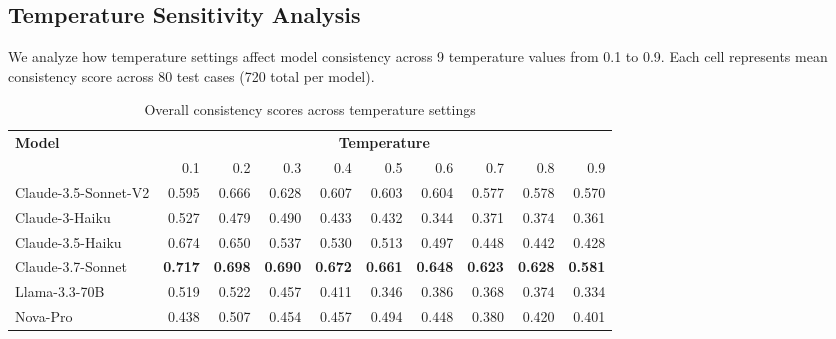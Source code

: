 \documentclass{article}
\begin{document}
\subsection{Temperature Sensitivity Analysis}

We analyze how temperature settings affect model consistency across 9 temperature values from 0.1 to 0.9. Each cell represents mean consistency score across 80 test cases (720 total per model).

\begin{table}[H]
\centering
\caption{Overall consistency scores across temperature settings}
\label{tab:overall-consistency-temp}
\begin{tabular}{lrrrrrrrrr}
\toprule
\textbf{Model} & \multicolumn{9}{c}{\textbf{Temperature}} \\
\cmidrule{2-10}
 & 0.1 & 0.2 & 0.3 & 0.4 & 0.5 & 0.6 & 0.7 & 0.8 & 0.9 \\
\midrule
Claude-3.5-Sonnet-V2 & 0.595 & 0.666 & 0.628 & 0.607 & 0.603 & 0.604 & 0.577 & 0.578 & 0.570 \\
Claude-3-Haiku & 0.527 & 0.479 & 0.490 & 0.433 & 0.432 & 0.344 & 0.371 & 0.374 & 0.361 \\
Claude-3.5-Haiku & 0.674 & 0.650 & 0.537 & 0.530 & 0.513 & 0.497 & 0.448 & 0.442 & 0.428 \\
Claude-3.7-Sonnet & \textbf{0.717} & \textbf{0.698} & \textbf{0.690} & \textbf{0.672} & \textbf{0.661} & \textbf{0.648} & \textbf{0.623} & \textbf{0.628} & \textbf{0.581} \\
Llama-3.3-70B & 0.519 & 0.522 & 0.457 & 0.411 & 0.346 & 0.386 & 0.368 & 0.374 & 0.334 \\
Nova-Pro & 0.438 & 0.507 & 0.454 & 0.457 & 0.494 & 0.448 & 0.380 & 0.420 & 0.401 \\
\bottomrule
\end{tabular}
\end{table}
\end{document}
